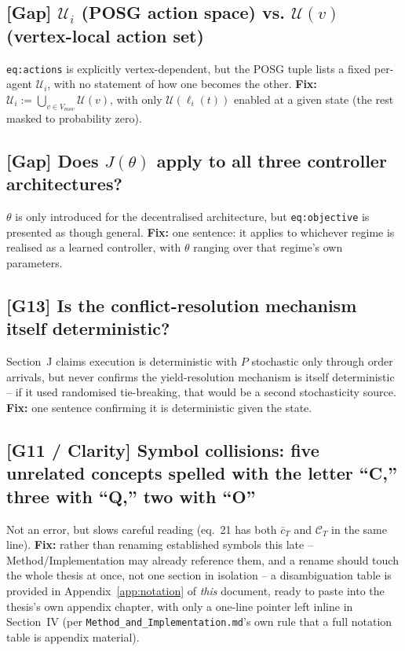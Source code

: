 \documentclass[11pt]{article}
\begin{document}
\subsection*{[Gap] \texorpdfstring{$\mathcal{U}_i$}{Ui} (POSG action space) vs. \texorpdfstring{$\mathcal{U}(v)$}{U(v)} (vertex-local action set)}
\texttt{eq:actions} is explicitly vertex-dependent, but the POSG tuple lists
a fixed per-agent $\mathcal{U}_i$, with no statement of how one becomes the
other. \textbf{Fix:} $\mathcal{U}_i := \bigcup_{v\in V_{mov}}\mathcal{U}(v)$,
with only $\mathcal{U}(\ell_i(t))$ enabled at a given state (the rest masked
to probability zero).

\subsection*{[Gap] Does \texorpdfstring{$J(\theta)$}{J(theta)} apply to all three controller architectures?}
$\theta$ is only introduced for the decentralised architecture, but
\texttt{eq:objective} is presented as though general. \textbf{Fix:} one
sentence: it applies to whichever regime is realised as a learned
controller, with $\theta$ ranging over that regime's own parameters.

\subsection*{[G13] Is the conflict-resolution mechanism itself deterministic?}
Section~J claims execution is deterministic with $P$ stochastic only through
order arrivals, but never confirms the yield-resolution mechanism is itself
deterministic -- if it used randomised tie-breaking, that would be a second
stochasticity source. \textbf{Fix:} one sentence confirming it is
deterministic given the state.

\subsection*{[G11 / Clarity] Symbol collisions: five unrelated concepts spelled with the letter ``C,'' three with ``Q,'' two with ``O''}
Not an error, but slows careful reading (eq.~21 has both $\bar c_T$ and
$\mathcal{C}_T$ in the same line). \textbf{Fix:} rather than renaming
established symbols this late -- Method/Implementation may already reference
them, and a rename should touch the whole thesis at once, not one section in
isolation -- a disambiguation table is provided in
Appendix~\ref{app:notation} of \emph{this} document, ready to paste into the
thesis's own appendix chapter, with only a one-line pointer left inline in
Section~IV (per \texttt{Method\_and\_Implementation.md}'s own rule that a
full notation table is appendix material).
\end{document}
